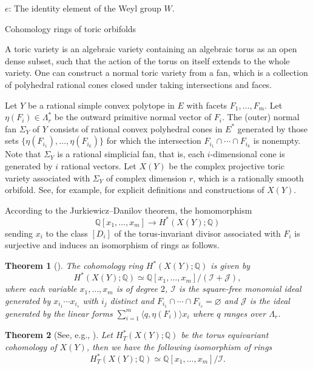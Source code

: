 \documentclass{amsart}
\makeatletter
\def\subsection{\@startsection{subsection}{2}
  \z@{.5\linespacing\@plus.7\linespacing}{.5\linespacing}
  {\normalfont\bfseries}}
\newtheorem{theorem}{Theorem}[section]
\theoremstyle{definition}
\theoremstyle{remark}
\numberwithin{equation}{section}
\makeatother
\begin{document}
$e$: The identity element of the Weyl group $W$.

\subsection{Cohomology rings of toric orbifolds}

A toric variety is an algebraic variety containing an algebraic torus as an open dense subset, such that the action of the torus on itself extends to the whole variety. One can construct a normal toric variety from a fan, which is a collection of polyhedral rational cones closed under taking intersections and faces.

Let $Y$ be a rational simple convex polytope in $E$ with facets $F_1, \ldots, F_m$. Let $\eta(F_i) \in \Lambda_r^*$ be the outward primitive normal vector of $F_i$. The (outer) normal fan $\Sigma_Y$ of $Y$ consists of rational convex polyhedral cones in $E^*$ generated by those sets $\{\eta(F_{i_1}), \ldots, \eta(F_{i_k})\}$ for which the intersection $F_{i_1}\cap\cdots\cap F_{i_k}$ is nonempty. Note that $\Sigma_Y$ is a rational simplicial fan, that is, each $i$-dimensional cone is generated by $i$ rational vectors. Let $X(Y)$ be the complex projective toric variety associated with $\Sigma_Y$ of complex dimension $r$, which is a rationally smooth orbifold. See, for example, \cite[sections 2.3 and 5.1]{cox2024toric} for explicit definitions and constructions of $X(Y)$.

According to the Jurkiewicz--Danilov theorem, the homomorphism 
\[
\mathbb{Q}[x_1, \ldots, x_m]\to H^*(X(Y) ; \mathbb{Q})
\]
 sending $x_i$ to the class $[D_i]$ of the torus-invariant divisor associated with $F_i$ is surjective and induces an isomorphism of rings as follows. 

\begin{theorem} [{\cite[Theorem 10.8 and Remark 10.9]{danilov1978geometry}}] \label{thm-pres-coh}
    The cohomology ring $H^*(X(Y) ; \mathbb{Q})$ is given by
\[
H^*(X(Y) ; \mathbb{Q})\simeq \mathbb{Q}[x_1, \ldots, x_m]/(\mathcal{I}+\mathcal{J}),
\]
where each variable $x_1, \ldots, x_m$ is of degree $2$, $\mathcal{I}$ is the square-free monomial ideal generated by $x_{i_1}\cdots x_{i_s}$ with $i_j$ distinct and $F_{i_1}\cap\cdots\cap F_{i_s} = \varnothing$ and $\mathcal{J}$ is the ideal generated by the linear forms $\sum_{i=1}^{m}\langle q, \eta(F_i)\rangle x_i$ where $q$ ranges over $\Lambda_r$.
\end{theorem}

\begin{theorem}[See, e.g., {\cite[section\ 12.4]{cox2024toric}}] \label{thm-pres-T-coh}
    Let $H^*_T(X(Y) ; \mathbb{Q})$ be the torus equivariant cohomology of $X(Y)$, then we have the following isomorphism of rings
\[
H^*_T(X(Y) ; \mathbb{Q})\simeq \mathbb{Q}[x_1, \ldots, x_m]/\mathcal{I}.
\]
\end{theorem}
\end{document}
